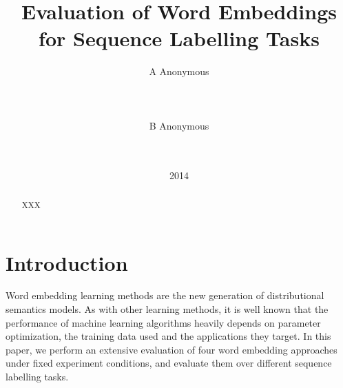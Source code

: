 \documentclass[11pt]{article}
\title{Evaluation of Word Embeddings for Sequence Labelling Tasks}
\author{A Anonymous 
   \\%
   \\ %
   \\ %
  \\ %
\And
  B Anonymous
   \\%
   \\%
   \\ %
}
\date{2014}
\begin{document}
\maketitle
\begin{abstract}
XXX
\end{abstract}

\newcommand{\gabi}[1]{\textcolor{blue}{#1}}
\newcommand{\tim}[1]{\textcolor{red}{#1}}
\newcommand{\lizhen}[1]{\textcolor{green}{#1}}
\newcommand{\nss}[1]{\textcolor{magenta}{#1}}

\section{Introduction}
Word embedding learning methods are the new generation of distributional
semantics models.  As with other learning methods, it is well known that
the performance of machine learning algorithms heavily depends on
parameter optimization, the training data used and the applications they
target.
In this paper, we perform an extensive evaluation of four word embedding
approaches under fixed experiment conditions, and evaluate them over
different sequence labelling tasks.
\end{document}
